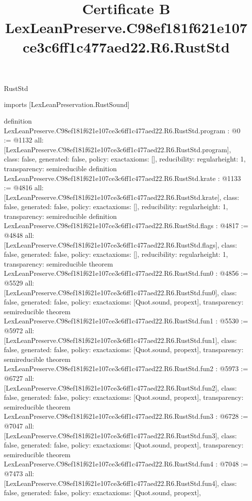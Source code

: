 \begin{lexlean}{RustStd}
\title{Certificate B LexLeanPreserve.C98ef181f621e107ce3c6ff1c477aed22.R6.RustStd}
\begin{coremodule}
imports [LexLeanPreservation.RustSound]

definition LexLeanPreserve.C98ef181f621e107ce3c6ff1c477aed22.R6.RustStd.program : @0 := @1132 {
  all: [LexLeanPreserve.C98ef181f621e107ce3c6ff1c477aed22.R6.RustStd.program],
  class: false,
  generated: false,
  policy: exact{axioms: []},
  reducibility: regular{height: 1},
  transparency: semireducible
}
definition LexLeanPreserve.C98ef181f621e107ce3c6ff1c477aed22.R6.RustStd.krate : @1133 := @4816 {
  all: [LexLeanPreserve.C98ef181f621e107ce3c6ff1c477aed22.R6.RustStd.krate],
  class: false,
  generated: false,
  policy: exact{axioms: []},
  reducibility: regular{height: 1},
  transparency: semireducible
}
definition LexLeanPreserve.C98ef181f621e107ce3c6ff1c477aed22.R6.RustStd.flags : @4817 := @4848 {
  all: [LexLeanPreserve.C98ef181f621e107ce3c6ff1c477aed22.R6.RustStd.flags],
  class: false,
  generated: false,
  policy: exact{axioms: []},
  reducibility: regular{height: 1},
  transparency: semireducible
}
theorem LexLeanPreserve.C98ef181f621e107ce3c6ff1c477aed22.R6.RustStd.fun0 : @4856 := @5529 {
  all: [LexLeanPreserve.C98ef181f621e107ce3c6ff1c477aed22.R6.RustStd.fun0],
  class: false,
  generated: false,
  policy: exact{axioms: [Quot.sound, propext]},
  transparency: semireducible
}
theorem LexLeanPreserve.C98ef181f621e107ce3c6ff1c477aed22.R6.RustStd.fun1 : @5530 := @5972 {
  all: [LexLeanPreserve.C98ef181f621e107ce3c6ff1c477aed22.R6.RustStd.fun1],
  class: false,
  generated: false,
  policy: exact{axioms: [Quot.sound, propext]},
  transparency: semireducible
}
theorem LexLeanPreserve.C98ef181f621e107ce3c6ff1c477aed22.R6.RustStd.fun2 : @5973 := @6727 {
  all: [LexLeanPreserve.C98ef181f621e107ce3c6ff1c477aed22.R6.RustStd.fun2],
  class: false,
  generated: false,
  policy: exact{axioms: [Quot.sound, propext]},
  transparency: semireducible
}
theorem LexLeanPreserve.C98ef181f621e107ce3c6ff1c477aed22.R6.RustStd.fun3 : @6728 := @7047 {
  all: [LexLeanPreserve.C98ef181f621e107ce3c6ff1c477aed22.R6.RustStd.fun3],
  class: false,
  generated: false,
  policy: exact{axioms: [Quot.sound, propext]},
  transparency: semireducible
}
theorem LexLeanPreserve.C98ef181f621e107ce3c6ff1c477aed22.R6.RustStd.fun4 : @7048 := @7473 {
  all: [LexLeanPreserve.C98ef181f621e107ce3c6ff1c477aed22.R6.RustStd.fun4],
  class: false,
  generated: false,
  policy: exact{axioms: [Quot.sound, propext]},
}
\end{coremodule}
\end{lexlean}
